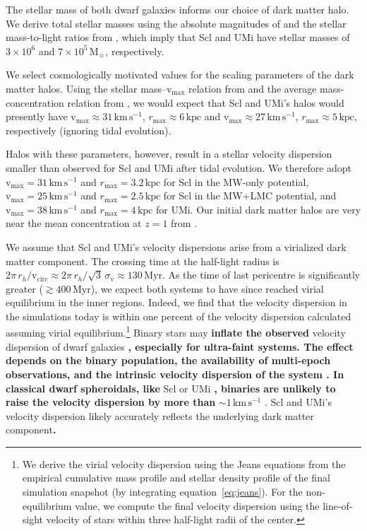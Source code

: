 \documentclass[linenumbers, twocolumn, twocolappendix]{aastex701}
\newcommand{\V}{\textrm{v}}
\newcommand{\vmax}{\V_\text{max}}
\newcommand{\rmax}{r_\text{max}}
\newcommand{\kpc}{\text{kpc}}
\newcommand{\kms}{\mathrm{km\,s^{-1}}}
\newcommand{\Mo}{\mathrm{M}_\sun}
\providecommand{\DIFadd}[1]{{\bf #1}} %
\providecommand{\DIFaddbegin}{} %
\providecommand{\DIFaddend}{} %
\begin{document}
The stellar mass of both dwarf galaxies informs our choice of dark matter halo. We derive total stellar masses using the absolute magnitudes of \citet{munoz+2018} and the stellar mass-to-light ratios from \citet{woo+courteau+dekel2008}, which imply that Scl and UMi have stellar masses of $3\times10^6$ and $7\times10^5\,\Mo$, respectively.

We select cosmologically motivated values for the scaling parameters of the dark matter halos. 
Using the stellar mass--$\vmax$ relation from \citet{fattahi+2018} and the average mass-concentration relation from \citet{ludlow+2016}, we would expect that Scl and UMi's halos would presently have $\vmax \approx 31 \,\kms$, $\rmax\approx6\,\kpc$ and $\vmax \approx 27\,\kms$, $\rmax\approx5\,\kpc$, respectively (ignoring tidal evolution). 

Halos with these parameters, however, result in a stellar velocity dispersion smaller than observed for Scl and UMi after tidal evolution. We therefore adopt  $\vmax = 31\,\kms$ and $\rmax=3.2\,\kpc$ for Scl in the MW-only potential, $\vmax=25\,\kms$ and $\rmax=2.5\,\kpc$ for Scl in the MW+LMC potential, and
$\vmax=38\,\kms$ and $\rmax=4\,\kpc$ for UMi. 
Our initial dark matter halos are very near the mean concentration at $z=1$ from \citet{ludlow+2016}.

We assume that Scl and UMi's velocity dispersions arise from a virialized dark matter component. The crossing time at the half-light radius is $2\pi\, r_h / \mathrm{v}_\textrm{circ} \approx 2\pi\, r_h / \sqrt{3}\,\sigma_\V \approx 130\,\text{Myr}$. As the time of last pericentre is significantly greater ($\gtrsim400\,\text{Myr}$), we expect both systems to have since reached virial equilibrium in the inner regions.
Indeed, we find that the velocity dispersion in the simulations today is within one percent of the velocity dispersion calculated assuming virial equilibrium.\footnote{
    We derive the virial velocity dispersion using the Jeans equations from the
    empirical cumulative mass profile and stellar density profile of the final
    simulation snapshot (by integrating equation~\ref{eq:jeans}). For the
    non-equilibrium value, we compute the final velocity dispersion using the
    line-of-sight velocity of stars within three half-light radii of the
    center.
}
Binary stars may  \DIFaddbegin \DIFadd{inflate the observed }\DIFaddend velocity dispersion of dwarf galaxies \DIFaddbegin \DIFadd{, especially for ultra-faint systems. The effect depends on the binary population, the availability of multi-epoch observations, and the intrinsic velocity dispersion of the system \citep{minor+2010, pianta+capuzzo-dolcetta+carraro2022, arroyo-polonio+battaglia+thomas2026}. In classical dwarf spheroidals, like }\DIFaddend Scl or UMi \DIFaddbegin \DIFadd{, binaries are unlikely to raise the velocity dispersion by more than }\DIFaddend ${\sim} 1\,\kms$  \citep[e.g.,][]{spencer+2017}.  Scl and UMi's velocity dispersion likely accurately reflects the underlying dark matter component\DIFaddbegin \DIFadd{.
}
\end{document}
